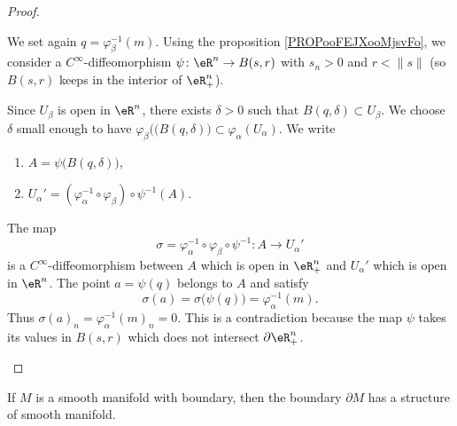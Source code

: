 \begin{proof}
\begin{subproof}
\begin{subproof}
			We set again \( q=\varphi_{\beta}^{-1}(m)\). Using the proposition  \ref{PROPooFEJXooMjsvFo}, we consider a \( C^{\infty}\)-diffeomorphism \(\psi \colon \eR^n\to B(s,r)  \) with \( s_n>0\) and \( r<\| s \|\) (so \( B(s,r)\) keeps in the interior of \( \eR^n_+\)).

			Since \( U_{\beta}\) is open in \( \eR^n\), there exists \( \delta>0\) such that \( B(q,\delta)\subset U_{\beta}\). We choose \( \delta\) small enough to have \( \varphi_{\beta}(\big( B(q,\delta) \big)\subset \varphi_{\alpha}(U_{\alpha})\). We write
			\begin{enumerate}
				\item
				      \( A=\psi\big( B(q,\delta) \big)\),
				\item
				      \( U_{\alpha}'=(\varphi_{\alpha}^{-1}\circ\varphi_{\beta})\circ\psi^{-1}(A)\).
			\end{enumerate}
			The map
			\begin{equation}
				\sigma=\varphi_{\alpha}^{-1}\circ\varphi_{\beta}\circ\psi^{-1} \colon A\to U_{\alpha}'
			\end{equation}
			is a \( C^{\infty}\)-diffeomorphism between \( A\) which is open in \( \eR^n_+\) and \( U_{\alpha}'\) which is open in \( \eR^n\). The point \( a=\psi(q)\) belongs to \( A\) and satisfy
			\begin{equation}
				\sigma(a)=\sigma\big( \psi(q) \big)=\varphi_{\alpha}^{-1}(m).
			\end{equation}
			Thus \( \sigma(a)_n=\varphi_{\alpha}^{-1}(m)_n=0 \). This is a contradiction because the map \( \psi\) takes its values in \( B(s,r)\) which does not intersect \( \partial \eR^n_+\).
		\end{subproof}
	\end{subproof}
\end{proof}

\begin{proposition}	\label{PROPooTENAooDxIAbf}
	If \( M\) is a smooth manifold with boundary, then the boundary \( \partial M\) has a structure of smooth manifold.
\end{proposition}

